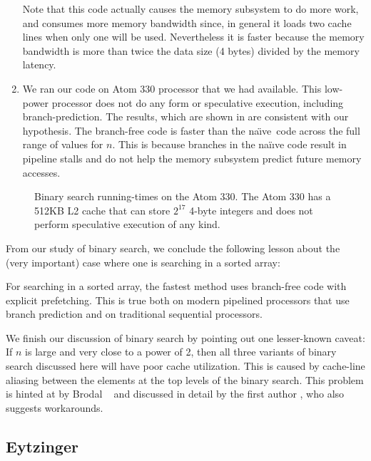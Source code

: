\documentclass{patmorin}
\newcommand{\naive}{na\"{\i}ve}
\begin{document}
\begin{enumerate}
   Note that this code actually causes the memory subsystem to do more
   work, and consumes more memory bandwidth since, in general it loads
   two cache lines when only one will be used.  Nevertheless it is faster
   because the memory bandwidth is more than twice the data size (4 bytes)
   divided by the memory latency.

\item We ran our code on Atom 330 processor that we had available.  This
   low-power processor does not do any form or speculative execution,
   including branch-prediction. The results, which are shown in
    are consistent with our hypothesis.  The
   branch-free code is faster than the \naive\ code across the full
   range of values for $n$.  This is because branches in the na\"i{\i}ve
   code result in pipeline stalls and do not help the memory subsystem
   predict future memory accesses.
\end{enumerate}

\begin{figure}
   \caption{Binary search running-times on the Atom 330. The Atom 330
   has a 512KB L2 cache that can store $2^{17}$ 4-byte integers and does
   not perform speculative execution of any kind.}
\end{figure}

From our study of binary search, we conclude the following lesson about
the (very important) case where one is searching in a sorted array:

\begin{lesson}
  For searching in a sorted array, the fastest method uses branch-free
  code with explicit prefetching.  This is true both on modern pipelined
  processors that use branch prediction and on traditional sequential
  processors.
\end{lesson}

We finish our discussion of binary search by pointing out one lesser-known
caveat:  If $n$ is large and very close to a power of 2, then all three
variants of binary search discussed here will have poor cache utilization.
This is caused by cache-line aliasing between the elements at the top
levels of the binary search.  This problem is hinted at by Brodal \etal\
\cite[Section~XX]{X} and discussed in detail by the first author \cite{X},
who also suggests workarounds.

\subsection{Eytzinger}
\end{document}
